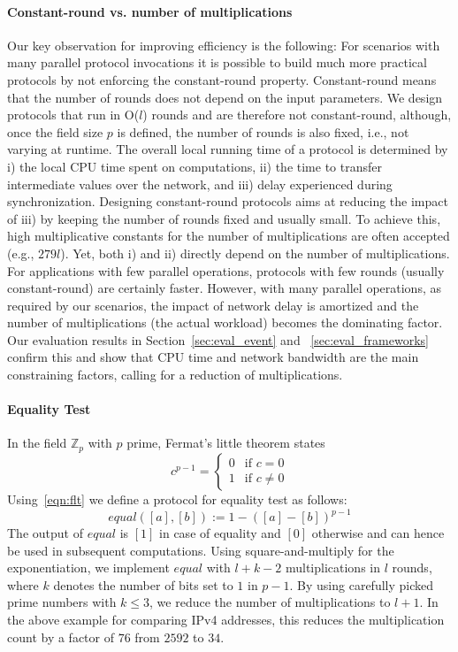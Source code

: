 \documentclass[letterpaper,11pt,onecolumn,titlepage]{article}
\begin{document}
\paragraph{Constant-round vs. number of multiplications}
Our key observation for improving efficiency is the following: For scenarios with many parallel protocol invocations it is 
possible to build much more practical protocols by not enforcing the constant-round property.
Constant-round means that the number of rounds does not depend on the input parameters. We design protocols that run in O($l$) rounds and are therefore not constant-round, although, once the field size $p$ is defined, the number of rounds is also fixed, i.e., not varying at runtime.
The overall local running time of a protocol is determined by i) the local CPU time spent on computations, ii) the time to transfer intermediate values over the network, and iii) delay experienced during synchronization.
Designing constant-round protocols aims at reducing the impact of iii) by keeping the number of rounds fixed and usually small. To achieve this, high multiplicative constants for the number of multiplications are often accepted (e.g., $279l$). Yet, both i) and ii) directly depend on the number of multiplications. 
For applications with few parallel operations, protocols with few rounds (usually constant-round) are certainly faster. However, with many parallel operations, as required by our scenarios, the impact of network delay is amortized and the number of multiplications (the actual workload) becomes the dominating factor. Our evaluation results in Section~\ref{sec:eval_event} and ~\ref{sec:eval_frameworks} confirm this and show that CPU time and network bandwidth are the main constraining factors, calling for a reduction of multiplications.






\paragraph{Equality Test} 
In the field $\mathbb{Z}_p$ with $p$ prime, Fermat's little theorem states
\begin{equation}
c^{p-1} = 
\begin{cases} 0 & \text{if $c=0$} \\
							1 &\text{if $c \neq 0$}
\end{cases}
\label{eqn:flt}
\end{equation}
Using~\eqref{eqn:flt} we define a protocol for equality test as follows:
\begin{equation*}
equal([a],[b]) := 1-([a]-[b])^{p-1}
\label{eqn:equal}
\end{equation*}
The output of $equal$ is $[1]$ in case of equality and $[0]$ otherwise and can hence be used in subsequent computations. Using square-and-multiply for the exponentiation, we implement $equal$ with $l+k-2$ multiplications in $l$ rounds, where $k$ denotes the number of bits set to $1$ in $p-1$. By using carefully picked prime numbers with $k \leq 3$, we reduce the number of multiplications to $l+1$. In the above example for comparing IPv4 addresses, this reduces the multiplication count by a factor of $76$ from $2592$ to $34$.
\end{document}
